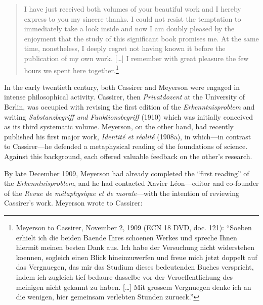 \begin{quote}
I have just received both volumes of your beautiful work and I hereby express to you my sincere thanks. I could not resist the temptation to immediately take a look inside and now I am doubly pleased by the enjoyment that the study of this significant book promises me. At the same time, nonetheless, I deeply regret not having known it before the publication of my own work. {[}\ldots{]} I remember with great pleasure the few hours we spent here together.\footnote{Meyerson to Cassirer, November 2, 1909 (ECN 18 DVD, doc. 121): ``Soeben erhielt ich die beiden Baende Ihres schoenen Werkes und spreche Ihnen hiermit meinen besten Dank aus. Ich habe der Versuchung nicht widerstehen koennen, sogleich einen Blick hineinzuwerfen und freue mich jetzt doppelt auf das Vergnuegen, das mir das Studium dieses bedeutenden Buches verspricht, indem ich zugleich tief bedaure dasselbe vor der Veroeffentlichung des meinigen nicht gekannt zu haben. {[}\ldots{]} Mit grossem Vergnuegen denke ich an die wenigen, hier gemeinsam verlebten Stunden zurueck.''}
\end{quote}

In the early twentieth century, both Cassirer and Meyerson were engaged in intense philosophical activity. Cassirer, then \emph{Privatdozent} at the University of Berlin, was occupied with revising the first edition of the \emph{Erkenntnisproblem} and writing \emph{Substanzbegriff und Funktionsbegriff} (1910) which was initially conceived as its third systematic volume. Meyerson, on the other hand, had recently published his first major work, \emph{Identité et réalité} (1908a), in which---in contrast to Cassirer---he defended a metaphysical reading of the foundations of science. Against this background, each offered valuable feedback on the other's research.

By late December 1909, Meyerson had already completed the ``first reading'' of the \emph{Erkenntnisproblem}, and he had contacted Xavier Léon---editor and co-founder of the \emph{Revue de métaphysique et de morale}---with the intention of reviewing Cassirer's work. Meyerson wrote to Cassirer:

